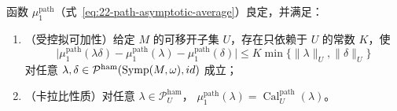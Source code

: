 \begin{proposition}
\label{prop:22-path-quasimorphism}
函数 $\mu_1^{\mathrm{path}}$（式~\eqref{eq:22-path-asymptotic-average}）良定，并满足：
\begin{enumerate}[label=\arabic*.]
\item （受控拟可加性）给定 $M$ 的可移开子集 $U$，存在只依赖于 $U$ 的常数 $K$，使
\begin{equation}
 \bigl|\mu_1^{\mathrm{path}}(\lambda\delta)
 -\mu_1^{\mathrm{path}}(\lambda)-\mu_1^{\mathrm{path}}(\delta)\bigr|
 \leq K\min\{\lVert\lambda\rVert_U,\lVert\delta\rVert_U\}
 \label{eq:22-controlled-quasi-additivity}
\end{equation}
对任意 $\lambda,\delta\in\mathcal P^{\mathrm{ham}}(\operatorname{Symp}(M,\omega),id)$ 成立；
\item （卡拉比性质）对任意 $\lambda\in\mathcal P_U^{\mathrm{ham}}$，
$\mu_1^{\mathrm{path}}(\lambda)=\operatorname{Cal}_U^{\mathrm{path}}(\lambda)$。
\end{enumerate}
\end{proposition}

